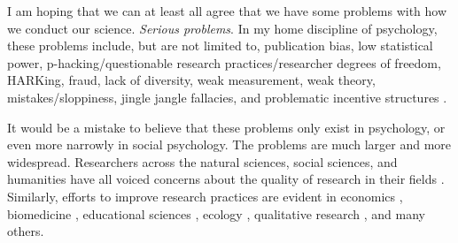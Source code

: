 \documentclass[authordate, empirical]{jote-new-article}
\author[1]{\mbox{Moin Syed\orcid{0000-0003-4759-3555}}}
\affil[1]{Department of Psychology, University of Minnesota}
\begin{document}
\begin{frontmatter}
  \maketitle
  \begin{abstract}
    \printabstracttext
  \end{abstract}
\end{frontmatter}
































\lettrine{I}{} am hoping that we can at least all agree that we have some problems with how we conduct our science. \emph{Serious problems}. In my home discipline of psychology, these problems include, but are not limited to, publication bias, low statistical power, p-hacking/questionable research practices/researcher degrees of freedom, HARKing, fraud, lack of diversity, weak measurement, weak theory, mistakes/sloppiness, jingle jangle fallacies, and problematic incentive structures \parencites{Chambers2017}{Spellman2015}{Syed2019}.







It would be a mistake to believe that these problems only exist in psychology, or even more narrowly in social psychology. The problems are much larger and more widespread. Researchers across the natural sciences, social sciences, and humanities have all voiced concerns about the quality of research in their fields \parencites{Baker2016}{Knöchelmann2019}{Munafò2017}. Similarly, efforts to improve research practices are evident in economics \parencites{Askarov2023}, biomedicine \parencites{Errington2021}, educational sciences \parencites{Fleming2021}, ecology \parencites{Fraser2018}, qualitative research \parencites{Humphreys2021}, and many others.
\end{document}
